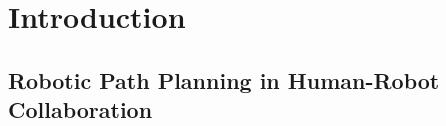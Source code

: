 \documentclass[phd]{byuprop}
\title{\Title}
\author{\Author}
\begin{document}
\maketitle

\section{Introduction}
\label{sec:intro}

\subsection{Robotic Path Planning in Human-Robot Collaboration}
\label{sec:intro:robotic_path_planning_in_human_robot_collaboration}
\end{document}
